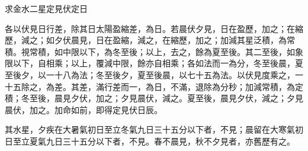 \begin{pinyinscope}
 求金水二星定見伏定日



 各以伏見日行差，除其日太陽盈縮差，為日。若晨伏夕見，日在盈歷，加之；在縮歷，減之；如夕伏晨見，日在盈縮，減之，在縮歷，加之；加減其星泛積，為常積。視常積，如中限以下，為冬至後；以上，去之，餘為夏至後。其二至後，如象限以下，自相乘；以上，覆減中限，餘亦自相乘；各如法而一為分，冬至後晨，夏至後夕，以一十八為法；冬至後夕，夏至後晨，以七十五為法。以伏見度乘之，一十五除之，為差。其差，滿行差而一，為日，不滿，退除為分秒；加減常積，為定積；冬至後，晨見夕伏，加之；夕見晨伏，減之。夏至後，晨見夕伏，減之；夕見晨伏，加之。加命如前，即得定見伏日辰。



 其水星，夕疾在大暑氣初日至立冬氣九日三十五分以下者，不見；晨留在大寒氣初日至立夏氣九日三十五分以下者，不見。春不晨見，秋不夕見者，亦舊歷有之。



\end{pinyinscope}